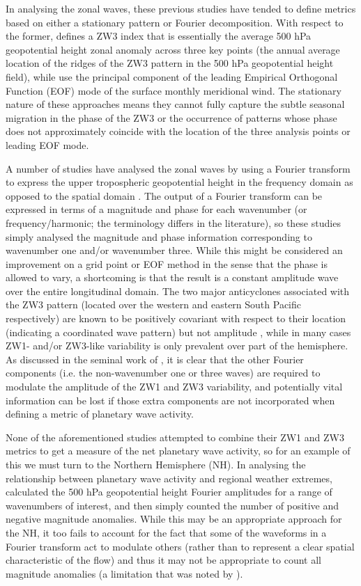 In analysing the zonal waves, these previous studies have tended to define metrics based on either a stationary pattern or Fourier decomposition. With respect to the former, \citet{Raphael2004} defines a ZW3 index that is essentially the average 500 hPa geopotential height zonal anomaly across three key points (the annual average location of the ridges of the ZW3 pattern in the 500 hPa geopotential height field), while \citet{Yuan2008} use the principal component of the leading Empirical Orthogonal Function (EOF) mode of the surface monthly meridional wind. The stationary nature of these approaches means they cannot fully capture the subtle seasonal migration in the phase of the ZW3 \citep[approximately 15 degrees of longitude on average;][]{vanLoon1984,Mo1985} or the occurrence of patterns whose phase does not approximately coincide with the location of the three analysis points or leading EOF mode.

A number of studies have analysed the zonal waves by using a Fourier transform to express the upper tropospheric geopotential height in the frequency domain as opposed to the spatial domain \citep{Hobbs2007,Hobbs2010,Turner2013}. The output of a Fourier transform can be expressed in terms of a magnitude and phase for each wavenumber (or frequency/harmonic; the terminology differs in the literature), so these studies simply analysed the magnitude and phase information corresponding to wavenumber one and/or wavenumber three. While this might be considered an improvement on a grid point or EOF method in the sense that the phase is allowed to vary, a shortcoming is that the result is a constant amplitude wave over the entire longitudinal domain. The two major anticyclones associated with the ZW3 pattern (located over the western and eastern South Pacific respectively) are known to be positively covariant with respect to their location (indicating a coordinated wave pattern) but not amplitude \citep{Hobbs2010}, while in many cases ZW1- and/or ZW3-like variability is only prevalent over part of the hemisphere. As discussed in the seminal work of \citet{vanLoon1972}, it is clear that the other Fourier components (i.e. the non-wavenumber one or three waves) are required to modulate the amplitude of the ZW1 and ZW3 variability, and potentially vital information can be lost if those extra components are not incorporated when defining a metric of planetary wave activity. 

None of the aforementioned studies attempted to combine their ZW1 and ZW3 metrics to get a measure of the net planetary wave activity, so for an example of this we must turn to the Northern Hemisphere (NH). In analysing the relationship between planetary wave activity and regional weather extremes, \citet{Screen2014} calculated the 500 hPa geopotential height Fourier amplitudes for a range of wavenumbers of interest, and then simply counted the number of positive and negative magnitude anomalies. While this may be an appropriate approach for the NH, it too fails to account for the fact that some of the waveforms in a Fourier transform act to modulate others (rather than to represent a clear spatial characteristic of the flow) and thus it may not be appropriate to count all magnitude anomalies (a limitation that was noted by \citet{Screen2014}).


